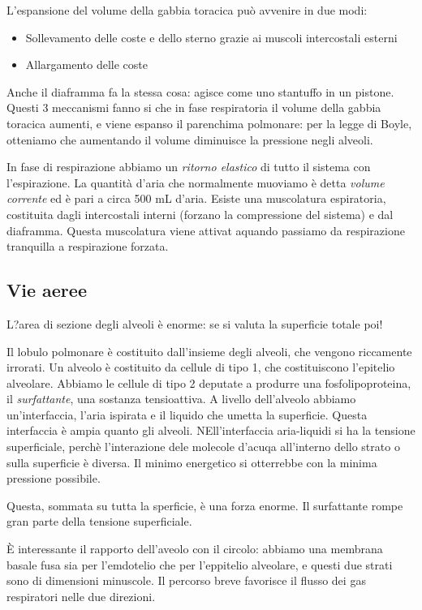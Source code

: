 \documentclass[a4paper,12pt]{article}
\begin{document}
L'espansione del volume della gabbia toracica può avvenire in due modi:
\begin{itemize}
\item{Sollevamento delle coste e dello sterno grazie ai muscoli intercostali esterni}
\item{Allargamento delle coste}
\end{itemize}

Anche il diaframma fa la stessa cosa: agisce come uno stantuffo in un pistone. Questi 3 meccanismi fanno si che in fase respiratoria il volume della gabbia toracica aumenti, e viene espanso il parenchima polmonare: per la legge di Boyle, otteniamo che aumentando il volume diminuisce la pressione negli alveoli.

In fase di respirazione abbiamo un \emph{ritorno elastico} di tutto il sistema con l'espirazione. La quantità d'aria che normalmente muoviamo è detta \emph{volume corrente} ed è pari a circa 500 mL d'aria. Esiste una muscolatura espiratoria, costituita dagli intercostali interni (forzano la compressione del sistema) e dal diaframma. Questa muscolatura viene attivat aquando passiamo da respirazione tranquilla a respirazione forzata.

\subsection{Vie aeree}
L?area di sezione degli alveoli è enorme: se si valuta la superficie totale poi!

Il lobulo polmonare è costituito dall'insieme degli alveoli, che vengono riccamente irrorati. Un alveolo è costituito da cellule di tipo 1, che costituiscono l'epitelio alveolare. Abbiamo le cellule di tipo 2 deputate a produrre una fosfolipoproteina, il \emph{surfattante}, una sostanza tensioattiva. A livello dell'alveolo abbiamo un'interfaccia, l'aria ispirata e il liquido che umetta la superficie. Questa interfaccia è ampia quanto gli alveoli. NEll'interfaccia aria-liquidi si ha la tensione superficiale, perchè l'interazione dele molecole d'acuqa all'interno dello strato o sulla superficie è diversa. Il minimo energetico si otterrebbe con la minima pressione possibile.
 
Questa, sommata su tutta la  sperficie, è una forza enorme. Il surfattante rompe gran parte della tensione superficiale.

È interessante il rapporto dell'aveolo con il circolo:  abbiamo una membrana basale fusa sia per l'emdotelio che per l'eppitelio alveolare, e questi due strati sono di dimensioni minuscole. Il percorso breve favorisce il flusso dei gas respiratori nelle due direzioni.
\end{document}
